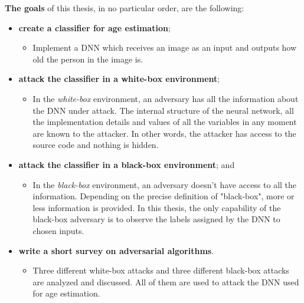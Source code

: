 \textbf{The goals} of this thesis, in no particular order, are the following:
\begin{itemize}

  \item \textbf{create a classifier for age estimation};
  	\begin{itemize}
  		\item Implement a DNN which receives an image as an input and outputs how old the person in the image is. 
     \end{itemize}
     
  \item \textbf{attack the classifier in a white-box environment};
  	\begin{itemize}
 		\item In the \textit{white-box} environment, an adversary has all the information about the DNN under attack. The internal structure of the neural network, all the implementation details and values of all the variables in any moment are known to the attacker. In other words, the attacker has access to the source code and nothing is hidden.
 	 \end{itemize}
 	 
 \item \textbf{attack the classifier in a black-box environment}; and
 \begin{itemize}
 	\item In the \textit{black-box} environment, an adversary doesn't have access to all the information. Depending on the precise definition of "black-box", more or less information is provided. In this thesis, the only capability of the black-box adversary is to observe the labels assigned by the DNN to chosen inputs.
 \end{itemize}
 
 \item \textbf{write a short survey on adversarial algorithms}.
  	 \begin{itemize}
  	 \item Three different white-box attacks and three different black-box attacks are analyzed and discussed.  All of them are used to attack the DNN used for age estimation.
 \end{itemize}	
 
\end{itemize}

